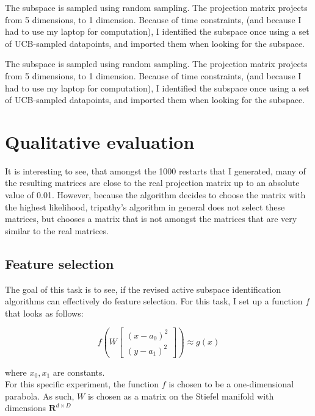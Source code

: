 The subspace is sampled using random sampling.
The projection matrix projects from 5 dimensions, to 1 dimension. 
Because of time constraints, (and because I had to use my laptop for computation), I identified the subspace once using a set of UCB-sampled datapoints, and imported them when looking for the subspace.



The subspace is sampled using random sampling.
The projection matrix projects from 5 dimensions, to 1 dimension. 
Because of time constraints, (and because I had to use my laptop for computation), I identified the subspace once using a set of UCB-sampled datapoints, and imported them when looking for the subspace.


\section{Qualitative evaluation}

It is interesting to see, that amongst the 1000 restarts that I generated, many of the resulting matrices are close to the real projection matrix up to an absolute value of 0.01.
However, because the algorithm decides to choose the matrix with the highest likelihood, tripathy's algorithm in general does not select these matrices, but chooses a matrix that is not amongst the matrices that are very similar to the real matrices.

\subsection{Feature selection}
The goal of this task is to see, if the revised active subspace identification algorithms can effectively do feature selection.
For this task, I set up a function $ f $ that looks as follows:

\def\B{
\begin{bmatrix}
    (x - a_0)^2 \\
    (y - a_1)^2
\end{bmatrix}}

\begin{equation} \label{eq:FeatureExtension}
f \left( W \B \right) \approx g \left( x \right)
\end{equation} 

where $x_0, x_1$ are constants. \\

For this specific experiment, the function $f$ is chosen to be a one-dimensional parabola. 
As such, $W$ is chosen as a matrix on the Stiefel manifold with dimensions $\mathbf{R}^{d \times D}$

